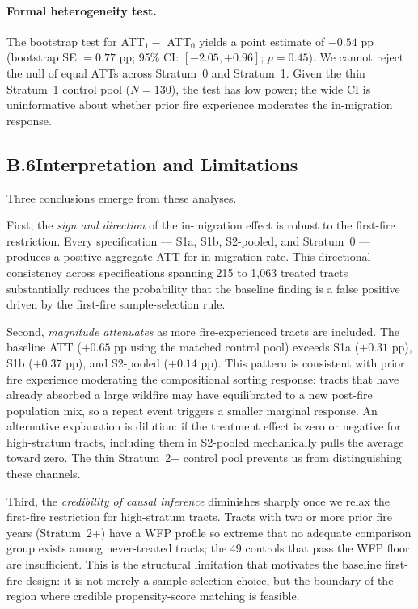 \documentclass[12pt]{article}
\begin{document}
\paragraph{Formal heterogeneity test.}
The bootstrap test for ATT$_1 -$ ATT$_0$ yields a point estimate of $-0.54$ pp
(bootstrap SE $= 0.77$ pp; 95\% CI: $[-2.05, +0.96]$; $p = 0.45$).
We cannot reject the null of equal ATTs across Stratum~0 and Stratum~1.
Given the thin Stratum~1 control pool ($N = 130$), the test has low power; the
wide CI is uninformative about whether prior fire experience moderates the
in-migration response.

\subsection*{B.6\quad Interpretation and Limitations}

Three conclusions emerge from these analyses.

First, the \emph{sign and direction} of the in-migration effect is robust to the
first-fire restriction.
Every specification --- S1a, S1b, S2-pooled, and Stratum~0 --- produces a positive
aggregate ATT for in-migration rate.
This directional consistency across specifications spanning 215 to 1,063 treated tracts
substantially reduces the probability that the baseline finding is a false positive
driven by the first-fire sample-selection rule.

Second, \emph{magnitude attenuates} as more fire-experienced tracts are included.
The baseline ATT ($+0.65$ pp using the matched control pool) exceeds S1a ($+0.31$ pp),
S1b ($+0.37$ pp), and S2-pooled ($+0.14$ pp).
This pattern is consistent with prior fire experience moderating the compositional
sorting response: tracts that have already absorbed a large wildfire may have
equilibrated to a new post-fire population mix, so a repeat event triggers a smaller
marginal response.
An alternative explanation is dilution: if the treatment effect is zero or negative
for high-stratum tracts, including them in S2-pooled mechanically pulls the average
toward zero.
The thin Stratum~2+ control pool prevents us from distinguishing these channels.

Third, the \emph{credibility of causal inference} diminishes sharply once we
relax the first-fire restriction for high-stratum tracts.
Tracts with two or more prior fire years (Stratum~2+) have a WFP profile so extreme
that no adequate comparison group exists among never-treated tracts; the 49 controls
that pass the WFP floor are insufficient.
This is the structural limitation that motivates the baseline first-fire design:
it is not merely a sample-selection choice, but the boundary of the region where
credible propensity-score matching is feasible.
\end{document}
